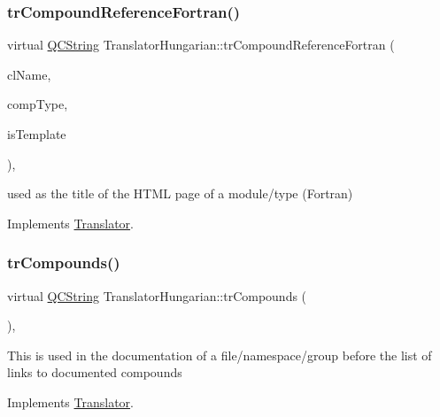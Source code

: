 \subsubsection{\texorpdfstring{trCompoundReferenceFortran()}{trCompoundReferenceFortran()}}
{\footnotesize\ttfamily virtual \mbox{\hyperlink{class_q_c_string}{Q\+C\+String}} Translator\+Hungarian\+::tr\+Compound\+Reference\+Fortran (\begin{DoxyParamCaption}\item[{const char $\ast$}]{cl\+Name,  }\item[{\mbox{\hyperlink{class_class_def_ae70cf86d35fe954a94c566fbcfc87939}{Class\+Def\+::\+Compound\+Type}}}]{comp\+Type,  }\item[{bool}]{is\+Template }\end{DoxyParamCaption})\hspace{0.3cm}{\ttfamily [inline]}, {\ttfamily [virtual]}}

used as the title of the H\+T\+ML page of a module/type (Fortran) 

Implements \mbox{\hyperlink{class_translator}{Translator}}.

\mbox{\label{class_translator_hungarian_a9b38e5ec80cf8e19b5d1911c966b4bc4}} 
\subsubsection{\texorpdfstring{trCompounds()}{trCompounds()}}
{\footnotesize\ttfamily virtual \mbox{\hyperlink{class_q_c_string}{Q\+C\+String}} Translator\+Hungarian\+::tr\+Compounds (\begin{DoxyParamCaption}{ }\end{DoxyParamCaption})\hspace{0.3cm}{\ttfamily [inline]}, {\ttfamily [virtual]}}

This is used in the documentation of a file/namespace/group before the list of links to documented compounds 

Implements \mbox{\hyperlink{class_translator}{Translator}}.

\mbox{\label{class_translator_hungarian_af8b59f35e7b87b0ca62d9f3e6e54946e}} 
